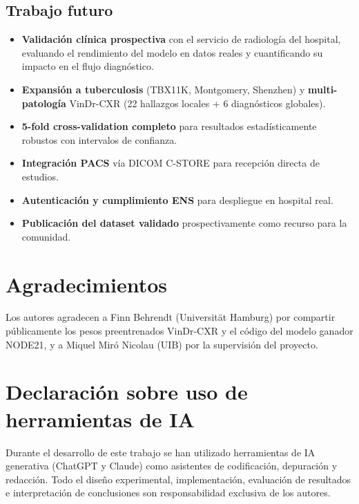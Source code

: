 \documentclass[conference]{IEEEtran}
\begin{document}
\subsection{Trabajo futuro}

\begin{itemize}
    \item \textbf{Validación clínica prospectiva} con el servicio de radiología del hospital, evaluando el rendimiento del modelo en datos reales y cuantificando su impacto en el flujo diagnóstico.
    \item \textbf{Expansión a tuberculosis} (TBX11K, Montgomery, Shenzhen) y \textbf{multi-patología} VinDr-CXR (22 hallazgos locales + 6 diagnósticos globales).
    \item \textbf{5-fold cross-validation completo} para resultados estadísticamente robustos con intervalos de confianza.
    \item \textbf{Integración PACS} vía DICOM C-STORE para recepción directa de estudios.
    \item \textbf{Autenticación y cumplimiento ENS} para despliegue en hospital real.
    \item \textbf{Publicación del dataset validado} prospectivamente como recurso para la comunidad.
\end{itemize}

\section*{Agradecimientos}

Los autores agradecen a Finn Behrendt (Universität Hamburg) por compartir públicamente los pesos preentrenados VinDr-CXR y el código del modelo ganador NODE21, y a Miquel Miró Nicolau (UIB) por la supervisión del proyecto.

\section*{Declaración sobre uso de herramientas de IA}

Durante el desarrollo de este trabajo se han utilizado herramientas de IA generativa (ChatGPT y Claude) como asistentes de codificación, depuración y redacción. Todo el diseño experimental, implementación, evaluación de resultados e interpretación de conclusiones son responsabilidad exclusiva de los autores.
\end{document}
